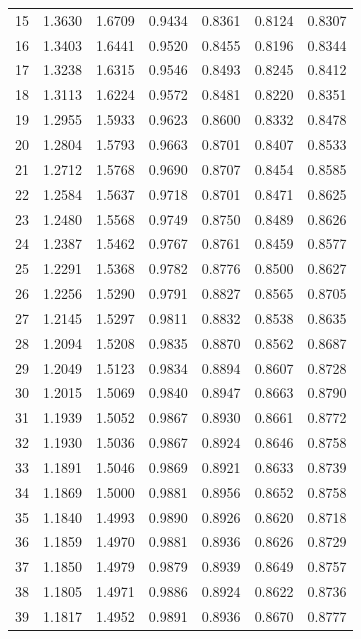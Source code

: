 \documentclass[runningheads]{llncs}
\begin{document}
\begin{longtable}{ccccccc}
15 & 1.3630 & 1.6709 & 0.9434 & 0.8361 & 0.8124 & 0.8307 \\
16 & 1.3403 & 1.6441 & 0.9520 & 0.8455 & 0.8196 & 0.8344 \\
17 & 1.3238 & 1.6315 & 0.9546 & 0.8493 & 0.8245 & 0.8412 \\
18 & 1.3113 & 1.6224 & 0.9572 & 0.8481 & 0.8220 & 0.8351 \\
19 & 1.2955 & 1.5933 & 0.9623 & 0.8600 & 0.8332 & 0.8478 \\
20 & 1.2804 & 1.5793 & 0.9663 & 0.8701 & 0.8407 & 0.8533 \\
21 & 1.2712 & 1.5768 & 0.9690 & 0.8707 & 0.8454 & 0.8585 \\
22 & 1.2584 & 1.5637 & 0.9718 & 0.8701 & 0.8471 & 0.8625 \\
23 & 1.2480 & 1.5568 & 0.9749 & 0.8750 & 0.8489 & 0.8626 \\
24 & 1.2387 & 1.5462 & 0.9767 & 0.8761 & 0.8459 & 0.8577 \\
25 & 1.2291 & 1.5368 & 0.9782 & 0.8776 & 0.8500 & 0.8627 \\
26 & 1.2256 & 1.5290 & 0.9791 & 0.8827 & 0.8565 & 0.8705 \\
27 & 1.2145 & 1.5297 & 0.9811 & 0.8832 & 0.8538 & 0.8635 \\
28 & 1.2094 & 1.5208 & 0.9835 & 0.8870 & 0.8562 & 0.8687 \\
29 & 1.2049 & 1.5123 & 0.9834 & 0.8894 & 0.8607 & 0.8728 \\
30 & 1.2015 & 1.5069 & 0.9840 & 0.8947 & 0.8663 & 0.8790 \\
31 & 1.1939 & 1.5052 & 0.9867 & 0.8930 & 0.8661 & 0.8772 \\
32 & 1.1930 & 1.5036 & 0.9867 & 0.8924 & 0.8646 & 0.8758 \\
33 & 1.1891 & 1.5046 & 0.9869 & 0.8921 & 0.8633 & 0.8739 \\
34 & 1.1869 & 1.5000 & 0.9881 & 0.8956 & 0.8652 & 0.8758 \\
35 & 1.1840 & 1.4993 & 0.9890 & 0.8926 & 0.8620 & 0.8718 \\
36 & 1.1859 & 1.4970 & 0.9881 & 0.8936 & 0.8626 & 0.8729 \\
37 & 1.1850 & 1.4979 & 0.9879 & 0.8939 & 0.8649 & 0.8757 \\
38 & 1.1805 & 1.4971 & 0.9886 & 0.8924 & 0.8622 & 0.8736 \\
39 & 1.1817 & 1.4952 & 0.9891 & 0.8936 & 0.8670 & 0.8777 \\
\end{longtable}
\end{document}
